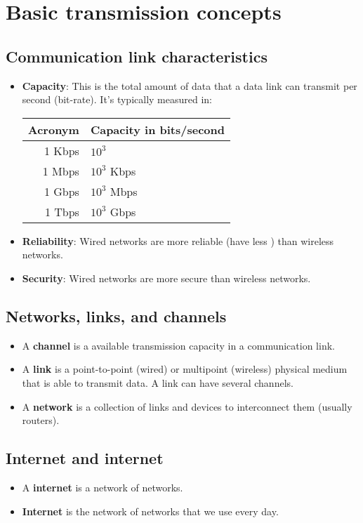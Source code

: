 \chapter{Basic transmission concepts}

\section{Communication link characteristics}
\begin{itemize}
\item \textbf{Capacity}: This is the total amount of data that a
  data link can transmit per second (bit-rate). It's typically measured in:
  \begin{tabular}{r|l}
    Acronym & Capacity in bits/second\\
    \hline
    1 Kbps & $10^3$\\
    1 Mbps & $10^3$ Kbps\\
    1 Gbps & $10^3$ Mbps\\
    1 Tbps & $10^3$ Gbps
  \end{tabular}
\item \textbf{Reliability}: Wired networks are more reliable
(have less ) than wireless networks.
\item \textbf{Security}: Wired networks are more secure than wireless
networks.
\end{itemize}

\section{Networks, links, and channels}
\begin{itemize}
\item A \textbf{channel} is a available transmission capacity in a communication link.
\item A \textbf{link} is a point-to-point (wired) or multipoint
(wireless) physical medium that is able to transmit data. A link can have several channels.
\item A \textbf{network} is a collection of links and devices to
interconnect them (usually routers).
\end{itemize}

\section{Internet and internet}
\begin{itemize}
\item A \textbf{internet} is a network of networks.
\item \textbf{Internet} is the network of networks that we use every day.
\end{itemize}


